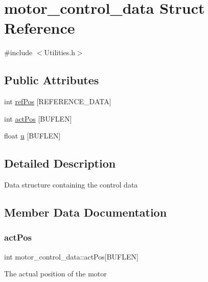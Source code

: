 \hypertarget{structmotor__control__data}{}\section{motor\+\_\+control\+\_\+data Struct Reference}
\label{structmotor__control__data}


{\ttfamily \#include $<$Utilities.\+h$>$}

\subsection*{Public Attributes}
\begin{DoxyCompactItemize}
\item 
int \mbox{\hyperlink{structmotor__control__data_ae6513e1fa4febfae80aa33ecabb99dbc}{ref\+Pos}} \mbox{[}R\+E\+F\+E\+R\+E\+N\+C\+E\+\_\+\+D\+A\+TA\mbox{]}
\item 
int \mbox{\hyperlink{structmotor__control__data_a15da9ec28fdeb23649bdf9755b82f229}{act\+Pos}} \mbox{[}B\+U\+F\+L\+EN\mbox{]}
\item 
float \mbox{\hyperlink{structmotor__control__data_aa1f8bd9efa226554a0cd30462bf215e9}{u}} \mbox{[}B\+U\+F\+L\+EN\mbox{]}
\end{DoxyCompactItemize}


\subsection{Detailed Description}
Data structure containing the control data 

\subsection{Member Data Documentation}
\mbox{\label{structmotor__control__data_a15da9ec28fdeb23649bdf9755b82f229}} 
\subsubsection{\texorpdfstring{act\+Pos}{actPos}}
{\footnotesize\ttfamily int motor\+\_\+control\+\_\+data\+::act\+Pos\mbox{[}B\+U\+F\+L\+EN\mbox{]}}

The actual position of the motor \mbox{\label{structmotor__control__data_ae6513e1fa4febfae80aa33ecabb99dbc}} 
